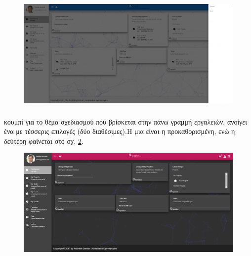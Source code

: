 \begin{figure}[!htb]
\includegraphics[width=\linewidth]{images/userNotifications.png}
\caption{}
\label{fig:userNotifications}
\end{figure}

\subsubsection*{}
 κουμπί για το θέμα σχεδιασμού που βρίσκεται στην πάνω γραμμή εργαλειών, ανοίγει ένα  με τέσσερις επιλογές (δύο διαθέσιμες).Η μια είναι η προκαθορισμένη, ενώ η δεύτερη φαίνεται στο σχ. \ref{fig:userDashboardDark}.

\begin{figure}[!htb]
\includegraphics[width=\linewidth]{images/userDashboardTHEME2.png}
\caption{}
\label{fig:userDashboardDark}
\end{figure}


